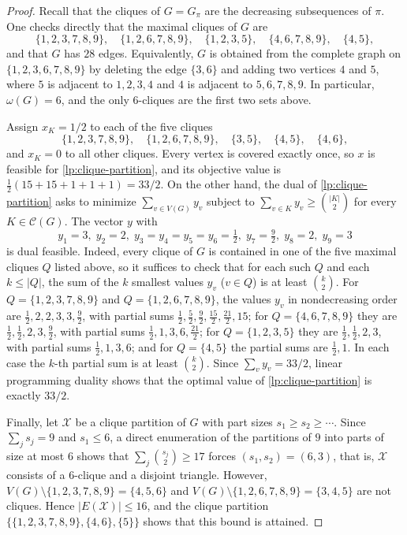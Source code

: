 \documentclass[a4paper,fleqn]{cas-sc}
\theoremstyle{remark}
\theoremstyle{plain}
\begin{document}
\begin{proof}
Recall that the cliques of $G=G_\pi$ are the decreasing subsequences of $\pi$.  One checks directly that the maximal cliques of $G$ are
\[
   \{1,2,3,7,8,9\},\quad \{1,2,6,7,8,9\},\quad \{1,2,3,5\},\quad \{4,6,7,8,9\},\quad \{4,5\},
\]
and that $G$ has $28$ edges.  Equivalently, $G$ is obtained from the complete graph on $\{1,2,3,6,7,8,9\}$ by deleting the edge $\{3,6\}$ and adding two vertices $4$ and $5$, where $5$ is adjacent to $1,2,3,4$ and $4$ is adjacent to $5,6,7,8,9$.  In particular, $\omega(G)=6$, and the only $6$-cliques are the first two sets above.

Assign $x_K=1/2$ to each of the five cliques
\[
  \{1,2,3,7,8,9\},\quad \{1,2,6,7,8,9\},\quad \{3,5\},\quad \{4,5\},\quad \{4,6\},
\]
and $x_K=0$ to all other cliques.  Every vertex is covered exactly once, so $x$ is feasible for \eqref{lp:clique-partition}, and its objective value is $\frac12(15+15+1+1+1)=33/2$.  On the other hand, the dual of \eqref{lp:clique-partition} asks to minimize $\sum_{v\in V(G)}y_v$ subject to $\sum_{v\in K}y_v\geq\binom{|K|}{2}$ for every $K\in\mathcal{C}(G)$. The vector $y$ with
\[
   y_1=3,\; y_2=2,\; y_3=y_4=y_5=y_6=\tfrac12,\; y_7=\tfrac92,\; y_8=2,\; y_9=3
\]
is dual feasible.  Indeed, every clique of $G$ is contained in one of the five maximal cliques $Q$ listed above, so it suffices to check that for each such $Q$ and each $k\leq|Q|$, the sum of the $k$ smallest values $y_v$ ($v\in Q$) is at least $\binom{k}{2}$.  For $Q=\{1,2,3,7,8,9\}$ and $Q=\{1,2,6,7,8,9\}$, the values $y_v$ in nondecreasing order are $\frac12,2,2,3,3,\frac92$, with partial sums $\frac12,\frac52,\frac92,\frac{15}{2},\frac{21}{2},15$; for $Q=\{4,6,7,8,9\}$ they are $\frac12,\frac12,2,3,\frac92$, with partial sums $\frac12,1,3,6,\frac{21}{2}$; for $Q=\{1,2,3,5\}$ they are $\frac12,\frac12,2,3$, with partial sums $\frac12,1,3,6$; and for $Q=\{4,5\}$ the partial sums are $\frac12,1$.  In each case the $k$-th partial sum is at least $\binom{k}{2}$.  Since $\sum_v y_v=33/2$, linear programming duality shows that the optimal value of \eqref{lp:clique-partition} is exactly $33/2$.

Finally, let $\mathcal{X}$ be a clique partition of $G$ with part sizes $s_1\geq s_2\geq\cdots$. Since $\sum_j s_j=9$ and $s_1\leq 6$, a direct enumeration of the partitions of $9$ into parts of size at most $6$ shows that $\sum_j\binom{s_j}{2}\geq 17$ forces $(s_1,s_2)=(6,3)$, that is, $\mathcal{X}$ consists of a $6$-clique and a disjoint triangle.  However, $V(G)\setminus\{1,2,3,7,8,9\}=\{4,5,6\}$ and $V(G)\setminus\{1,2,6,7,8,9\}=\{3,4,5\}$ are not cliques.  Hence $|E(\mathcal{X})|\leq 16$, and the clique partition $\{\{1,2,3,7,8,9\},\{4,6\},\{5\}\}$ shows that this bound is attained.
\end{proof}
\end{document}
